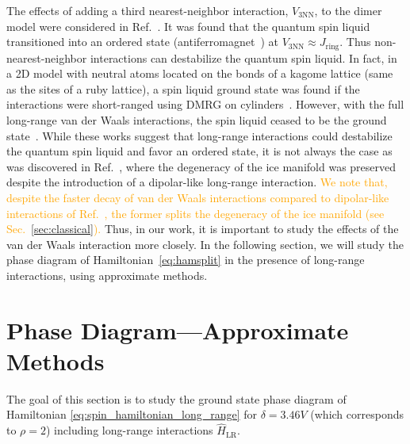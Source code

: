\documentclass[twocolumn,superscriptaddress,amsmath,amssymb,aps,prx,nofootinbib]{revtex4-2}
\newcommand{\addtext}[1]{\textcolor{orange}{#1}}
\begin{document}
  The effects of adding a third nearest-neighbor interaction, $V_{\text{3NN}}$, to the dimer model were considered in Ref.~\cite{pace2021}. It was found that the quantum spin liquid transitioned into an ordered state (antiferromagnet~\cite{chen2016magnetic}) at $V_{\text{3NN}} \approx J_{\text{ring}}$. 
  Thus non-nearest-neighbor interactions can destabilize the quantum spin liquid.
  In fact, in a 2D model with neutral atoms located on the bonds of a kagome lattice (same as the sites of a ruby lattice), a spin liquid ground state was found if the interactions were short-ranged using DMRG on cylinders~\cite{verresen2021,semeghini2021}. However, with the full long-range van der Waals interactions, the spin liquid ceased to be the ground state~\cite{verresen2021,semeghini2021}. 
While these works suggest that long-range interactions could destabilize the quantum spin liquid and favor an ordered state, it is not always the case as was discovered in Ref.~\cite{isakov2005why}, where the degeneracy of the ice manifold was preserved despite the introduction of a dipolar-like long-range interaction.
  \addtext{We note that, despite the faster decay of van der Waals interactions compared to dipolar-like interactions of Ref.~\cite{isakov2005why}, the former splits the degeneracy of the ice manifold (see Sec.~\ref{sec:classical}).}
Thus, in our work, it is important to study the effects of the van der Waals interaction more closely.
  In the following section, we will study the phase diagram of Hamiltonian~\eqref{eq:hamsplit} in the presence of long-range interactions, using approximate methods. 

\section{Phase Diagram---Approximate Methods}\label{sec:meanfield}
The goal of this section is to study the ground state phase diagram of Hamiltonian \eqref{eq:spin_hamiltonian_long_range} for $\delta = 3.46 V$ (which corresponds to $\rho = 2$) including long-range interactions $\hat{H}_{\text{LR}}$.
\end{document}
